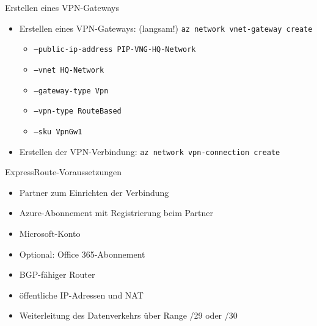 \begin{flashcard}[Definition]{Erstellen eines VPN-Gateways}
    \begin{itemize}
        \item Erstellen eines VPN-Gateways: (langsam!)\newline
            \texttt{az network vnet-gateway create}
            \begin{itemize}
                \item \texttt{--public-ip-address PIP-VNG-HQ-Network}
                \item \texttt{--vnet HQ-Network}
                \item \texttt{--gateway-type Vpn}
                \item \texttt{--vpn-type RouteBased}
                \item \texttt{--sku VpnGw1}
            \end{itemize}
        \item Erstellen der VPN-Verbindung:\newline
            \texttt{az network vpn-connection create}
    \end{itemize}
\end{flashcard}



\begin{flashcard}[Definition]{ExpressRoute-Voraussetzungen}
    \begin{itemize}
        \item Partner zum Einrichten der Verbindung
        \item Azure-Abonnement mit Registrierung beim Partner
        \item Microsoft-Konto
        \item Optional: Office 365-Abonnement
        \item BGP-fähiger Router
        \item öffentliche IP-Adressen und NAT
        \item Weiterleitung des Datenverkehrs über Range /29 oder /30
    \end{itemize}
\end{flashcard}

